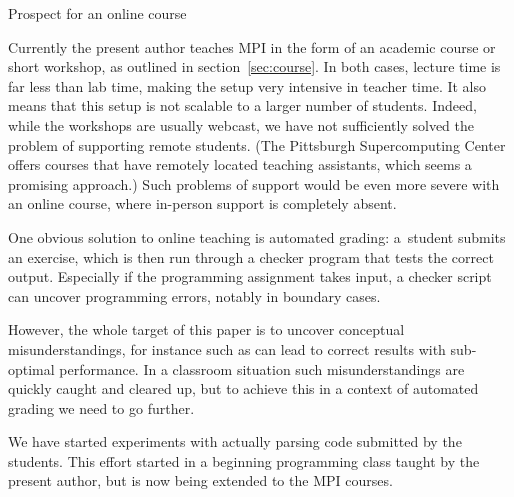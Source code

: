 \begin{comment}
  \Level 1 {Evaluation and supervision}

  In our academic class the programming exercises are done partly in
  class and partly as homework. They are very lightly
  graded: the majority of the grade comes from a programming project
  that is the student's own initiative and coded from scratch.

  In the workshop format there is no grading, but the instructor plus
  possible assistants are continuously monitoring students to help them
  over stumbling blocks and clarify concepts, both in MPI and elementary
  programming. We have found that one instructor or assistant per 8--10
  students is a good ratio; more students per instructor will have
  students fall by the wayside. The typical exercise takes 15--30 minutes.
\end{comment}

 {Prospect for an online course}
\label{sec:online}

Currently the present author teaches MPI in the form of an academic
course or short workshop, as outlined in section~\ref{sec:course}.
In both cases, lecture time is far less than lab time, making the
setup very intensive in teacher time. It also means that this setup is
not scalable to a larger number of students. Indeed, while the
workshops are usually webcast, we have not sufficiently solved the
problem of supporting remote students. (The Pittsburgh Supercomputing
Center offers courses that have remotely located teaching assistants,
which seems a promising approach.)
Such problems of support would be even more severe with an online
course, where in-person support is completely absent.

One obvious solution to online teaching is automated grading:
a~student submits an exercise, which is then run through a checker
program that tests the correct output. Especially if the programming
assignment takes input, a checker script can uncover programming
errors, notably in boundary cases.

However, the whole target of this paper is to uncover conceptual
misunderstandings, for instance such as can lead to correct results
with sub-optimal performance. In a classroom situation such
misunderstandings are quickly caught and cleared up, but to achieve
this in a context of automated grading we need to go further.

We have started experiments with actually parsing code submitted by
the students. This effort started in a beginning programming class
taught by the present author, but is now being extended to the MPI courses.

